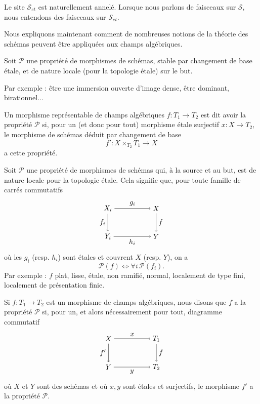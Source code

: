\documentclass[10pt]{article}
\begin{document}
Le site $\mathscr S_{et}$ est naturellement annelé. Lorsque nous parlons de faisceaux sur $\mathscr S$, nous entendons des faisceaux sur $\mathscr S_{et}$.


Nous expliquons maintenant comment de nombreuses notions de la théorie des schémas peuvent être appliquées aux champs algébriques.

Soit $\mathcal P$ une propriété de morphismes de schémas, stable par changement de base étale, et de nature locale (pour la topologie étale) sur le but.

Par exemple : être une immersion ouverte d'image dense, être dominant, birationnel...

Un morphisme représentable de champs algébriques $f:T_1\to T_2$ est dit avoir la propriété $\mathcal P$ si, pour un (et donc pour tout) morphisme étale surjectif $x:X\to T_2$, le morphisme de schémas déduit par changement de base
\[
f':X\times_{T_2}T_1\longrightarrow X
\]
a cette propriété.

Soit $\mathcal P$ une propriété de morphismes de schémas qui, à la source et au but, est de nature locale pour la topologie étale. Cela signifie que, pour toute famille de carrés commutatifs
\[
\begin{tikzpicture}[baseline=(current bounding box.center), node distance=1.6cm]
\node (Xi) at (0,1.4) {$X_i$};
\node (X) at (2.4,1.4) {$X$};
\node (Yi) at (0,0) {$Y_i$};
\node (Y) at (2.4,0) {$Y$};
\draw[->] (Xi) -- node[above] {$g_i$} (X);
\draw[->] (Xi) -- node[left] {$f_i$} (Yi);
\draw[->] (X) -- node[right] {$f$} (Y);
\draw[->] (Yi) -- node[below] {$h_i$} (Y);
\end{tikzpicture}
\]
où les $g_i$ (resp. $h_i$) sont étales et couvrent $X$ (resp. $Y$), on a
\[
\mathcal P(f)\Longleftrightarrow \forall i\,\mathcal P(f_i).
\]
Par exemple : $f$ plat, lisse, étale, non ramifié, normal, localement de type fini, localement de présentation finie.

Si $f:T_1\to T_2$ est un morphisme de champs algébriques, nous disons que $f$ a la propriété $\mathcal P$ si, pour un, et alors nécessairement pour tout, diagramme commutatif
\[
\begin{tikzpicture}[baseline=(current bounding box.center)]
\node (X) at (0,1.4) {$X$};
\node (T1) at (2.4,1.4) {$T_1$};
\node (Y) at (0,0) {$Y$};
\node (T2) at (2.4,0) {$T_2$};
\draw[->] (X) -- node[above] {$x$} (T1);
\draw[->] (X) -- node[left] {$f'$} (Y);
\draw[->] (T1) -- node[right] {$f$} (T2);
\draw[->] (Y) -- node[below] {$y$} (T2);
\end{tikzpicture}
\]
où $X$ et $Y$ sont des schémas et où $x,y$ sont étales et surjectifs, le morphisme $f'$ a la propriété $\mathcal P$.
\end{document}
